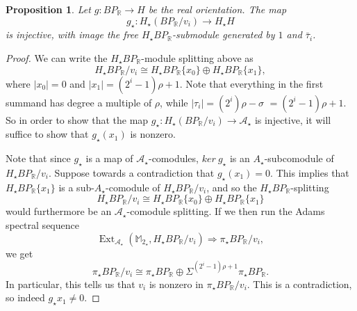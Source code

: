 \documentclass{amsart}
\newtheorem{proposition}[equation]{Proposition}
\theoremstyle{plain}
\numberwithin{equation}{section}
\numberwithin{figure}{section}
\DeclareMathOperator{\Ext}{Ext}
\newcommand{\mM}{{\mathbb M}}
\newcommand{\mR}{{\mathbb R}}
\newcommand{\cA}{{\mathcal A}}
\newcommand{\0}{\langle 0 \rangle }
\begin{document}
\begin{proposition}
   Let $g: BP_\mR \to H$ be the real orientation. The map 
    \[
    g_{\star}: H_\star (BP_\mR / {v}_i) \to H_\star H
    \]
    is injective, with image the free $H_\star BP_\mR$-submodule generated by $1$ and $\bar{\tau}_{i}$. 
\end{proposition}

\begin{proof}
We can write the $H_{\star}BP_{\mR}$-module splitting above as \[H_{\star}BP_{\mR}/{v}_{i}\cong H_{\star}BP_{\mR}\{x_{0}\} \oplus  H_{\star}BP_{\mR}\{x_{1}\}, \] where $|x_{0}| = 0$ and $|x_{1}| = (2^{i}-1)\rho + 1$. Note that everything in the first summand has degree a multiple of $\rho$, while $\vert \tau_i \vert = (2^i)\rho - \sigma$ $=(2^i-1)\rho + 1$. So in order to show that the map $g_{\star}: H_\star (BP_\mR / {v}_i) \to \cA_{\star} $ is injective, it will suffice to show that $g_{\star}(x_{1})$ is nonzero.

Note that since $g_{\star}$ is a map of $\cA_{\star}$-comodules, $ker\ g_{\star}$ is an $A_{\star}$-subcomodule of $H_{\star}BP_{\mR}/{v}_{i}$. Suppose towards a contradiction that $g_{\star}(x_{1}) = 0$. This implies that $H_{\star}BP_{\mR}\{x_{1}\}$ is a sub-$A_{\star}$-comodule of $H_{\star}BP_{\mR}/{v}_{i}$, and so the $H_{\star}BP_{\mR}$-splitting 
\[
H_{\star}BP_{\mR}/{v}_{i}\cong H_{\star}BP_{\mR}\{x_{0}\} \oplus H_{\star}BP_{\mR}\{x_{1}\} 
\]
would furthermore be an $\cA_{\star}$-comodule splitting. If we then run the Adams spectral sequence
\[
\Ext_{\cA_{\star}}\left(\mM_{2_{\star}}, H_{\star}BP_{\mR}/v_{i} \right) \Longrightarrow \pi_{\star}BP_{\mR}/{v}_{i},
\] 
we get 
\[
\pi_{\star}BP_{\mR}/{v}_{i} \cong \pi_{\star}BP_{\mR} \oplus \Sigma^{(2^i-1)\rho + 1}\pi_{\star}BP_{\mR}.
\]
In particular, this tells us that ${v}_{i}$ is nonzero in $\pi_{\star}BP_{\mR}/{v}_{i}$. This is a contradiction, so indeed $g_{\star}x_{1} \neq 0$.


\end{proof}
\end{document}
